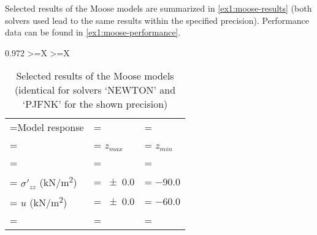 Selected results of the Moose models are summarized in \autoref{ex1:moose-results}
(both solvers used lead to the same results within the specified precision).
Performance data can be found in \autoref{ex1:moose-performance}.

\begin{table}[htbp]
    \centering
    \caption{Selected results of the Moose models \\(identical for solvers ‘NEWTON’ and ‘PJFNK’ for the shown precision)}
    \label{ex1:moose-results}

    \begin{tabularx}{0.972\hsize}{
            >{\hsize\linewidth=\hsize}X
            >{\hsize\linewidth=\hsize}X}
        {\begin{tabularx}{1\linewidth}{
                     >{\hsize\linewidth=\hsize}X
                     >{\hsize\linewidth=\hsize\hspace{-5pt}}Y
                     >{\hsize\linewidth=\hsize\hspace{-5pt}}Y}
                 \toprule
                 Model response                                                                        &                      \\
                 {}                                                                                    & $z_{max}$                    & $z_{min}$         \\
                 \midrule

                                                                                                                   \\
                 \hspace{1em} $\sigma'_{zz}$ (\unit[per-mode = symbol]{\kilo\newton\per\square\metre}) & \qty{\pm0.0}{}               & \qty{-90.0}{}     \\
                 \hspace{1em} $u$            (\unit[per-mode = symbol]{\kilo\newton\per\square\metre}) & \qty{\pm0.0}{}               & \qty{-60.0}{}     \\

                 {}                                                                                    & {}                           & {}                \\


\end{tabularx}}
\end{tabularx}
\end{table}
